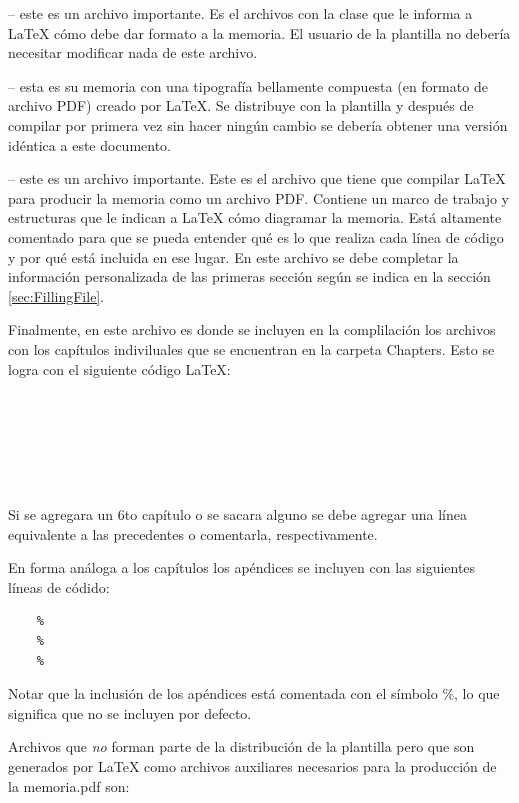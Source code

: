  -- este es un archivo importante. Es el archivos con la clase que le informa a \LaTeX{} cómo debe dar formato a la memoria. El usuario de la plantilla no debería necesitar modificar nada de este archivo.

 -- esta es su memoria con una tipografía bellamente compuesta (en formato de archivo PDF) creado por \LaTeX{}. Se distribuye con la plantilla y después de compilar por primera vez sin hacer ningún cambio se debería obtener una versión idéntica a este documento.

 -- este es un archivo importante. Este es el archivo que tiene que compilar \LaTeX{} para producir la memoria como un archivo PDF. Contiene un marco de trabajo y estructuras que le indican a \LaTeX{} cómo diagramar la memoria.  Está altamente comentado para que se pueda entender qué es lo que realiza cada línea de código y por qué está incluida en ese lugar.  En este archivo se debe completar la información personalizada de las primeras sección según se indica en la sección \ref{sec:FillingFile}.

Finalmente, en este archivo es donde se incluyen en la complilación los archivos  con los capítulos indiviluales que se encuentran en la carpeta Chapters.  Esto se logra con el siguiente código \LaTeX{}:

\begin{verbatim}
	
	 
	
	 
	
\end{verbatim}

Si se agregara un 6to capítulo o se sacara alguno se debe agregar una línea equivalente a las precedentes o comentarla, respectivamente.

En forma análoga a los capítulos los apéndices se incluyen con las siguientes líneas de códido:
\begin{verbatim}
	%
	%
	%
\end{verbatim}

Notar que la inclusión de los apéndices está comentada con el símbolo \%, lo que significa que no se incluyen por defecto.

Archivos que \emph{no} forman parte de la distribución de la plantilla pero que son generados por \LaTeX{} como archivos auxiliares necesarios para la producción de la memoria.pdf son:

